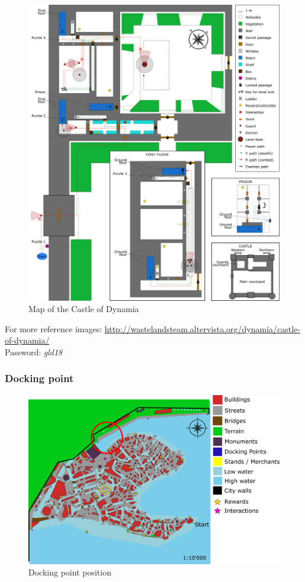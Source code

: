 \begin{figure}[H]
  \centering
  \includegraphics[width=\textwidth]{Images/Maps/castleOfDynamia}
  \caption{Map of the Castle of Dynamia}
\end{figure}

For more reference images: \url{http://wastelandsteam.altervista.org/dynamia/castle-of-dynamia/}\\
Password: \textit{gld18}

\subsubsection{Docking point}
\begin{figure}[H]
  \centering
  \includegraphics[width=12cm]{Images/Maps/dynamia_dockingPoint}
  \caption{Docking point position}
\end{figure}
  

